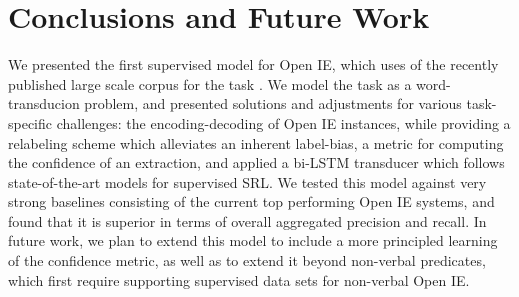\documentclass[11pt,a4paper]{article}
\begin{document}
\section{Conclusions and Future Work}
\label{sec:conclusions}
We presented the first supervised model for Open IE,
which uses of the recently published large scale corpus for the task \cite{Stanovsky2016EMNLP}.
We model the task as a word-transducion problem, and presented solutions and
adjustments for various task-specific challenges: the encoding-decoding of Open IE instances, while providing a relabeling scheme which alleviates an inherent label-bias, a metric for computing the confidence of an extraction,
and applied a bi-LSTM transducer which follows state-of-the-art models for supervised SRL.
We tested this model against very strong baselines consisting of the current top performing Open IE systems, and
found that it is superior in terms of overall aggregated precision and recall.
In future work, we plan to extend this model to include a more principled learning of the confidence metric,
as well as to extend it beyond non-verbal predicates, which first require supporting supervised
data sets for non-verbal Open IE.

%
%


\end{document}
